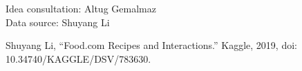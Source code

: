 \documentclass[sigconf]{acmart}
\begin{document}
%
\begin{acks}
Idea consultation: Altug Gemalmaz\\
Data source: Shuyang Li
\end{acks}



Shuyang Li, “Food.com Recipes and Interactions.” Kaggle, 2019, doi: 10.34740/KAGGLE/DSV/783630.
\end{document}
